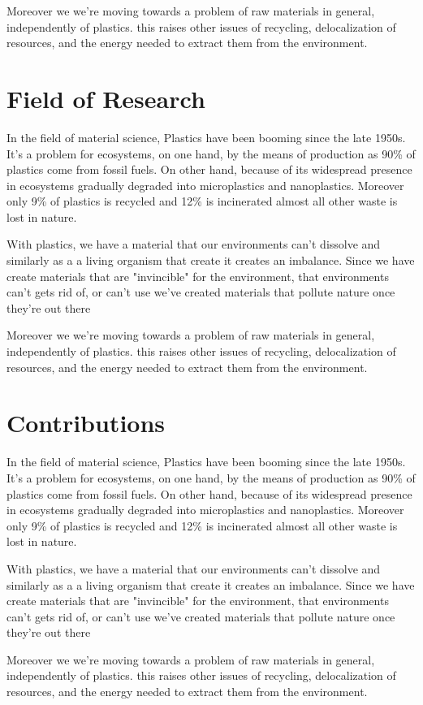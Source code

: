 Moreover we we're moving towards a problem of raw materials in general, independently of plastics. this raises other issues of recycling, 
delocalization of resources, and the energy needed to extract them from the environment.


\section{Field of Research}

In the field of material science, Plastics have been booming since the late 1950s\cite{geyer2017production}.
It's a problem for ecosystems, on one hand, by the means of production as 90\% of plastics come from fossil fuels. On other hand,
because of its widespread presence in ecosystems gradually degraded into microplastics and nanoplastics.
Moreover only 9\% of plastics is recycled and 12\% is incinerated almost all other waste is lost in nature\cite{natureeditorial}.

With plastics, we have a material that our environments can't dissolve and similarly as a a living organism that create
it creates an imbalance. Since we have create materials that are "invincible" for the environment,  that environments can't gets rid of, or can't use
we've created materials that pollute nature once they're out there

Moreover we we're moving towards a problem of raw materials in general, independently of plastics. this raises other issues of recycling, 
delocalization of resources, and the energy needed to extract them from the environment.

\section{Contributions}

In the field of material science, Plastics have been booming since the late 1950s\cite{geyer2017production}.
It's a problem for ecosystems, on one hand, by the means of production as 90\% of plastics come from fossil fuels. On other hand,
because of its widespread presence in ecosystems gradually degraded into microplastics and nanoplastics.
Moreover only 9\% of plastics is recycled and 12\% is incinerated almost all other waste is lost in nature\cite{natureeditorial}.

With plastics, we have a material that our environments can't dissolve and similarly as a a living organism that create
it creates an imbalance. Since we have create materials that are "invincible" for the environment,  that environments can't gets rid of, or can't use
we've created materials that pollute nature once they're out there

Moreover we we're moving towards a problem of raw materials in general, independently of plastics. this raises other issues of recycling, 
delocalization of resources, and the energy needed to extract them from the environment.
